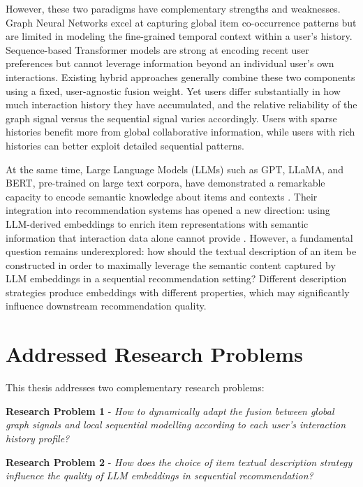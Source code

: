 \documentclass[12pt,a4paper]{report}
\begin{document}
However, these two paradigms have complementary strengths and weaknesses.
Graph Neural Networks excel at capturing global item co-occurrence patterns
but are limited in modeling the fine-grained temporal context within a
user's history. Sequence-based Transformer models are strong at encoding
recent user preferences but cannot leverage information beyond an individual
user's own interactions. Existing hybrid approaches generally combine these
two components using a fixed, user-agnostic fusion weight. Yet users differ
substantially in how much interaction history they have accumulated, and the
relative reliability of the graph signal versus the sequential signal
varies accordingly. Users with sparse histories benefit more from global
collaborative information, while users with rich histories can better
exploit detailed sequential patterns.

At the same time, Large Language Models (LLMs) such as GPT, LLaMA, and
BERT, pre-trained on large text corpora, have demonstrated a remarkable
capacity to encode semantic knowledge about items and contexts
\citep{wu2023survey,liu2024llmers}. Their integration into recommendation
systems has opened a new direction: using LLM-derived embeddings to
enrich item representations with semantic information that interaction
data alone cannot provide \citep{harte2023leveraging,liu2024llmers}. However,
a fundamental question remains underexplored: how should the textual
description of an item be constructed in order to maximally leverage the
semantic content captured by LLM embeddings in a sequential recommendation
setting? Different description strategies produce embeddings with different
properties, which may significantly influence downstream recommendation
quality.

\section*{Addressed Research Problems}

This thesis addresses two complementary research problems:

\medskip
\noindent\textbf{Research Problem 1} - \textit{How to dynamically adapt the
fusion between global graph signals and local sequential modelling according
to each user's interaction history profile?}

\medskip
\noindent\textbf{Research Problem 2} - \textit{How does the choice of item
textual description strategy influence the quality of LLM embeddings in
sequential recommendation?}
\end{document}
